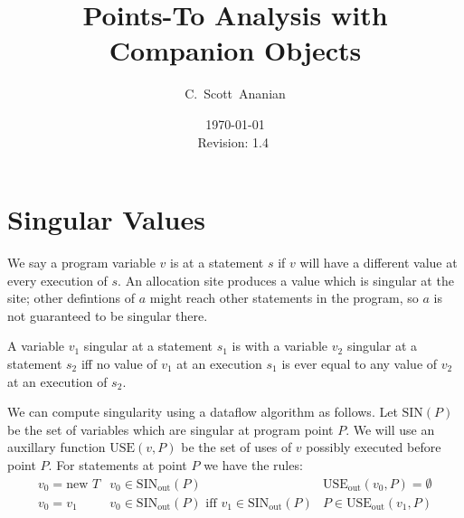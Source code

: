 \documentclass[11pt,notitlepage]{article}
\author{C.~Scott~Ananian}
\title{Points-To Analysis with Companion Objects}
\date{\today \\ $ $Revision: 1.4 $ $}
\begin{document}
%
\maketitle
\section{Singular Values}

We say a program variable $v$ is  at a statement $s$
if $v$ will have a different value at every execution of $s$.  An
allocation site  produces a value which is singular
at the site; other defintions of $a$ might reach other statements in
the program, so $a$ is not guaranteed to be singular there.

A variable $v_1$ singular at a statement $s_1$ is
 with a variable $v_2$ singular at a statement
$s_2$ iff no value of $v_1$ at an execution $s_1$ is ever equal to any
value of $v_2$ at an execution of $s_2$.




We can compute singularity using a dataflow algorithm as follows.
Let $\text{SIN}(P)$ be the set of variables which are singular
at program point $P$.  We will use an auxillary function
$\text{USE}(v, P)$ be the set of uses of $v$ possibly executed before
point $P$.  For statements at point $P$ we have the rules:
\begin{displaymath}
\begin{array}{lll}
v_0 = \text{new } T & v_0 \in \text{SIN}_{\text{out}}(P)
                    & \text{USE}_{\text{out}}(v_0, P) = \emptyset \\
v_0 = v_1 & v_0 \in \text{SIN}_{\text{out}}(P) \text{ iff }
            v_1 \in \text{SIN}_{\text{out}}(P)
          & P \in \text{USE}_{\text{out}}(v_1, P) \\

%
\end{array}
\end{displaymath}
\end{document}
